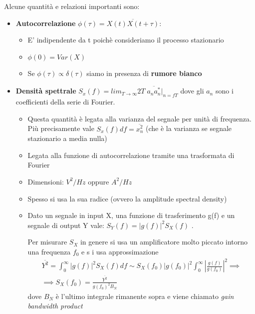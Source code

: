 Alcune quantità e relazioni importanti sono:
\begin{itemize}
    \item \textbf{Autocorrelazione}  $\phi(\tau)=\overline{X(t)X(t+\tau)}$:
    \begin{itemize}
        \item E' indipendente da t poichè consideriamo il processo stazionario
        \item $\phi(0)=Var(X)$
        \item Se $\phi(\tau)\propto \delta(\tau)$ siamo in presenza di \textbf{rumore bianco}
    \end{itemize}
    \item \textbf{Densità spettrale} $S_x(f)=lim_{T\to \infty}2T\; \overline{a_na_n^*}|_{n=fT}$ dove gli $a_n $ sono i coefficienti della serie di Fourier.
    \begin{itemize}
        \item Questa quantità è legata alla varianza del segnale per unità di frequenza. Più precisamente vale $S_x(f)df=\overline{x_n^2}$ (che è la varianza se segnale  stazionario a media nulla)

\item Legata alla funzione di autocorrelazione tramite una trasformata di Fourier

\item Dimensioni: $V^2/Hz$ oppure $A^2/Hz$

\item Spesso si usa la sua radice (ovvero la amplitude spectral density)

\item Dato un segnale in input X, una funzione di trasferimento g(f) e un segnale di output Y vale:
  $S_Y(f)=|g(f)|^2 S_X(f)$ .

  Per misurare $S_X$ in genere si usa un amplificatore molto piccato intorno una frequenza $f_0$ e s i usa approssimazione $$\begin{gathered}
      \overline{Y^2}=\int_0^\infty |g(f)|^2 S_X(f)df\sim S_X(f_0)|g(f_0)|^2\int_0^\infty |\frac{g(f)}{g(f_0)}|^2  \implies \\  \implies S_X(f_0)=\frac{\overline{Y^2}}{g(f_0)^2B_N}
  \end{gathered}$$ dove $B_N$ è l'ultimo integrale rimanente sopra e viene chiamato \textit{gain bandwidth product}
    \end{itemize}
\end{itemize}

